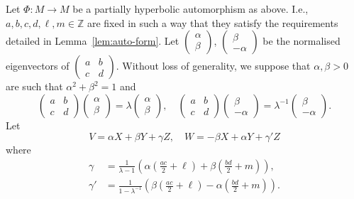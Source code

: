 \documentclass[a4paper,11pt]{amsart}
\theoremstyle{remark}
\newcommand{\bZ}{\mathbb{Z}} %
\begin{document}
Let \(\Phi : M \to M\) be a partially hyperbolic automorphism as above.
I.e., \(a,b,c,d,\ell,m \in \bZ\) are fixed in such a way that they satisfy the requirements detailed in Lemma~\ref{lem:auto-form}.
Let \(\left( \begin{smallmatrix} \alpha \\ \beta \end{smallmatrix}\right)\), \(\left( \begin{smallmatrix} \beta \\ -\alpha \end{smallmatrix}\right)\) be the normalised eigenvectors of \(\left(\begin{smallmatrix} a & b \\ c & d \end{smallmatrix}\right) \).
Without loss of generality, we suppose that \(\alpha, \beta > 0\) are such that \(\alpha^2 + \beta^2 = 1\) and
\[
    \left(\begin{smallmatrix} a & b \\ c & d \end{smallmatrix}\right) \left( \begin{smallmatrix} \alpha \\ \beta \end{smallmatrix}\right) = \lambda \left( \begin{smallmatrix} \alpha \\ \beta \end{smallmatrix}\right),
    \quad
    \left(\begin{smallmatrix} a & b \\ c & d \end{smallmatrix}\right) \left( \begin{smallmatrix} \beta \\ -\alpha \end{smallmatrix}\right) = \lambda^{-1} \left( \begin{smallmatrix} \beta \\ -\alpha \end{smallmatrix}\right).
\]
Let
\begin{equation}\label{eq:frame}
    V = \alpha X + \beta Y + \gamma Z, \quad
    W = -\beta X + \alpha Y + \gamma' Z
\end{equation}
where
\[
    \begin{aligned}
        \gamma  & = \tfrac{1}{\lambda - 1} \left(\alpha(\tfrac{ac}{2} + \ell) + \beta(\tfrac{bd}{2} + m)\right),      \\
        \gamma' & = \tfrac{1}{1 - \lambda^{-1}} \left(\beta(\tfrac{ac}{2} + \ell) - \alpha(\tfrac{bd}{2} + m)\right).
    \end{aligned}
\]
\end{document}
